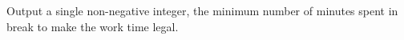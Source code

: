 
    Output a single non-negative integer, the minimum number of minutes spent in break to make the work time legal.
